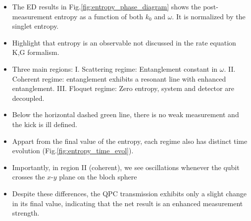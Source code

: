 \documentclass[10pt,
 amsmath,amssymb,
 aps,prb, twocolumn
]{revtex4-2}
\begin{document}
\begin{itemize}

\item The ED results in Fig.\ref{fig:entropy_phase_diagram} shows the post-measurement entropy as a function of both $k_0$ and $\omega$. It is normalized by the singlet entropy.

\item Highlight that entropy is an observable not discussed in the rate equation K,G formalism.

\item Three main regions: I. Scattering regime:  Entanglement constant in $\omega$. II. Coherent regime: entanglement exhibits a resonant line with enhanced entanglement. III. Floquet regime: Zero entropy, system and detector are decoupled.

\item Below the horizontal dashed green line, there is no weak measurement and the kick is ill defined. 

\item Appart from the final value of the entropy, each regime also has distinct time evolution (Fig.\ref{fig:entropy_time_evol}). 

\item Importantly, in region II (coherent), we see oscillations whenever the qubit crosses the $x$-$y$ plane on the bloch sphere

\item Despite these differences, the QPC transmission exhibits only a  slight change in its final value, indicating that the net result is an enhanced measurement strength.
\end{itemize}
\end{document}
